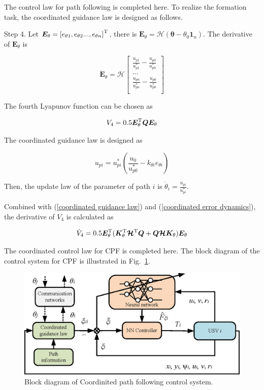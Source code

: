 \documentclass[english]{cccconf}
\begin{document}
The control law for path following is completed here. To realize the formation task, the coordinated guidance law is designed as follows.

Step 4. Let $\bm{E}_\theta=\left[e_{\theta 1},e_{\theta 2}...,e_{\theta n}\right]^{\rm T}$, there is $\bm{E}_\theta=\bm{\mathcal{H}}(\bm{\theta}-\theta_0\bm{1}_n)$. The derivative of $\bm{E}_\theta$ is

\begin{equation}\label{coordinated error dynamics}
	\dot{\bm{E}}_\theta=\bm{\mathcal{H}}
	\begin{bmatrix}
		\frac{u_{p1}}{u^*_{p1}}-\frac{u_{p0}}{u^*_{p0}}\\
		...\\
		\frac{u_{pn}}{u^*_{pn}}-\frac{u_{p0}}{u^*_{p0}}\\
	\end{bmatrix}
\end{equation}

The fourth Lyapunov function can be chosen as

\begin{equation}
	V_4=0.5\bm{E}^{\rm T}_\theta \bm{Q} \bm{E}_\theta
\end{equation}

The coordinated guidance law is designed as

\begin{equation}\label{coordinated guidance law}
	u_{pi}=u^{*}_{pi}(\frac{u_0}{u^*_{p0}}-k_{\theta i}e_{\theta i})
\end{equation}

Then, the update law of the parameter of path $i$ is $\dot{\theta}_i=\frac{u_{pi}}{u^*_{pi}}$.

Combined with (\ref{coordinated guidance law}) and (\ref{coordinated error dynamics}), the derivative of $V_4$ is calculated as

\begin{equation}\label{V4dot}
	\dot{V}_4=0.5\bm{E}^{\rm T}_\theta(\bm{K}^{\rm T}_\theta \bm{\mathcal{H}}^{\rm T}\bm{Q}+\bm{Q}\bm{\mathcal{H}}\bm{K}_\theta)\bm{E}_\theta
\end{equation} 

The coordinated control law for CPF is completed here. The block diagram of the control system for CPF is illustrated in Fig.~\ref{CPFCS}.

\begin{figure}[!htb]
	\centering
	\includegraphics[width=\hsize]{CPFCS.eps}
	\caption{Block diagram of Coordinited path following control system.}
	\label{CPFCS}
\end{figure}
\end{document}
